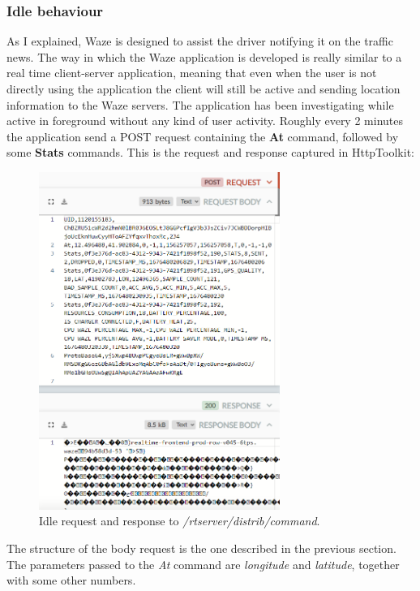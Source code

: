 		\subsubsection{Idle behaviour}
			\par As I explained, Waze is designed to assist the driver notifying it on the traffic news. The way in which the Waze application is developed is really similar to a real time client-server application, meaning that even when the user is not directly using the application the client will still be active and sending location information to the Waze servers. \newline
			The application has been investigating while active in foreground without any kind of user activity. Roughly every 2 minutes the application send a POST request containing the \textbf{At} command, followed by some \textbf{Stats} commands. This is the request and response captured in HttpToolkit:
			\begin{figure}[H]
				\centering
				\includegraphics[width=0.7\textwidth]{images/waze_idle.png}
				\caption{Idle request and response to \textit{/rtserver/distrib/command}.}
			\end{figure}
			The structure of the body request is the one described in the previous section.\newline
			The parameters passed to the \textit{At} command are \textit{longitude} and \textit{latitude}, together with some other numbers.\newline
